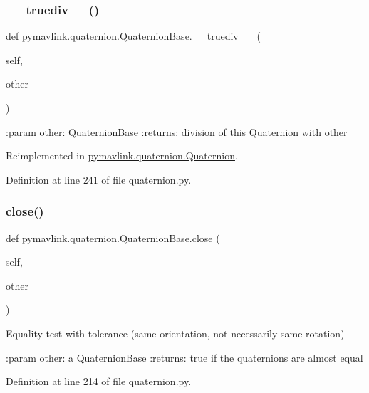 \subsubsection{\texorpdfstring{\_\_truediv\_\_()}{\_\_truediv\_\_()}}
{\footnotesize\ttfamily def pymavlink.\+quaternion.\+Quaternion\+Base.\+\_\+\+\_\+truediv\+\_\+\+\_\+ (\begin{DoxyParamCaption}\item[{}]{self,  }\item[{}]{other }\end{DoxyParamCaption})}

\begin{DoxyVerb}:param other: QuaternionBase
:returns: division of this Quaternion with other
\end{DoxyVerb}
 

Reimplemented in \mbox{\hyperlink{classpymavlink_1_1quaternion_1_1Quaternion_a768c82f6b6fbb4e9c3a496e494a0c587}{pymavlink.\+quaternion.\+Quaternion}}.



Definition at line 241 of file quaternion.\+py.

\mbox{\label{classpymavlink_1_1quaternion_1_1QuaternionBase_ae368fa4a7df294b50db40a17d20c0908}} 
\subsubsection{\texorpdfstring{close()}{close()}}
{\footnotesize\ttfamily def pymavlink.\+quaternion.\+Quaternion\+Base.\+close (\begin{DoxyParamCaption}\item[{}]{self,  }\item[{}]{other }\end{DoxyParamCaption})}

\begin{DoxyVerb}Equality test with tolerance
(same orientation, not necessarily same rotation)


:param other: a QuaternionBase
:returns: true if the quaternions are almost equal
\end{DoxyVerb}
 

Definition at line 214 of file quaternion.\+py.

\mbox{\label{classpymavlink_1_1quaternion_1_1QuaternionBase_a534fc3e09f0c3b65e8fe5105d39e4891}} 
